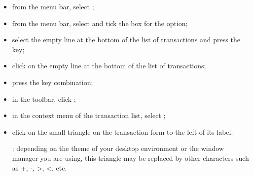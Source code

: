 \begin{itemize}
	\item from the menu bar, select ;
	\item from the menu bar, select  and tick the box for the  option;
	\item select the empty line at the bottom of the list of transactions and press the  key;
	\item click on the empty line at the bottom of the list of transactions;
	\item press the  key combination;
	\item in the toolbar, click ;
	\item in the context menu of the transaction list, select ;
	\item click on the small  triangle on the transaction form to the left of its label.
	
	\Note{}: depending on the theme of your desktop environment or the window manager you are using, this triangle may be replaced by other characters such as +, -, >, <, etc.
\end{itemize}

